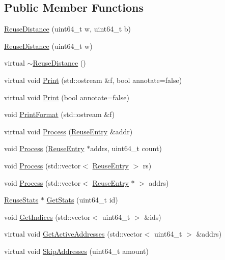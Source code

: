 \subsection*{Public Member Functions}
\begin{DoxyCompactItemize}
\item 
\hyperlink{class_reuse_distance_a0248afa697da0f6c87c6fd30c289ecc6}{ReuseDistance} (uint64\_\-t w, uint64\_\-t b)
\item 
\hyperlink{class_reuse_distance_ab68a2d9df5c28571c3f8820c5344b2c1}{ReuseDistance} (uint64\_\-t w)
\item 
virtual \hyperlink{class_reuse_distance_a2846a6f2c045759657b754838045900d}{$\sim$ReuseDistance} ()
\item 
virtual void \hyperlink{class_reuse_distance_ae693ec30500fcdd2222f0f07d207c0ce}{Print} (std::ostream \&f, bool annotate=false)
\item 
virtual void \hyperlink{class_reuse_distance_a2ce354238975243f602201787c9282ba}{Print} (bool annotate=false)
\item 
void \hyperlink{class_reuse_distance_a027a92a58a6639e8ed13a7490d11dcf5}{PrintFormat} (std::ostream \&f)
\item 
virtual void \hyperlink{class_reuse_distance_a4ff6b77022ce62e0fdefa5cc297b932a}{Process} (\hyperlink{struct_reuse_entry}{ReuseEntry} \&addr)
\item 
void \hyperlink{class_reuse_distance_aed9cbdd99de67972a37de4624614de9d}{Process} (\hyperlink{struct_reuse_entry}{ReuseEntry} $\ast$addrs, uint64\_\-t count)
\item 
void \hyperlink{class_reuse_distance_a372960c10d5fb6552c8dfcfd77da38ba}{Process} (std::vector$<$ \hyperlink{struct_reuse_entry}{ReuseEntry} $>$ rs)
\item 
void \hyperlink{class_reuse_distance_a88052f5ae1e69bab8fe1f9b7b87c1037}{Process} (std::vector$<$ \hyperlink{struct_reuse_entry}{ReuseEntry} $\ast$ $>$ addrs)
\item 
\hyperlink{class_reuse_stats}{ReuseStats} $\ast$ \hyperlink{class_reuse_distance_a771580c25dc5140969919e959e2ebdd1}{GetStats} (uint64\_\-t id)
\item 
void \hyperlink{class_reuse_distance_a99fb4b3aae663676515ad354691b7cc6}{GetIndices} (std::vector$<$ uint64\_\-t $>$ \&ids)
\item 
virtual void \hyperlink{class_reuse_distance_acc4885040a8a518fc10b5aa4da7d777a}{GetActiveAddresses} (std::vector$<$ uint64\_\-t $>$ \&addrs)
\item 
virtual void \hyperlink{class_reuse_distance_a0763528236db14a9e0234465e72da3b6}{SkipAddresses} (uint64\_\-t amount)
\end{DoxyCompactItemize}
